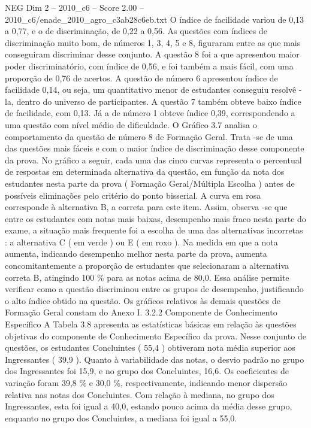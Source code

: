 \begin{textsample}{NEG Dim 2 – 2010\_c6 – Score 2.00 – 2010\_c6/enade\_2010\_agro\_c3ab28c6eb.txt}
O índice de facilidade variou de 0,13 a 0,77, e o de discriminação, de 0,22 a 0,56.
As questões com índices de discriminação muito bom, de números 1, 3, 4, 5 e 8, figuraram entre as que mais conseguiram discriminar desse conjunto.
A questão 8 foi a que apresentou maior poder discriminatório, com índice de 0,56, e foi também a mais fácil, com uma proporção de 0,76 de acertos.
A questão de número 6 apresentou índice de facilidade 0,14, ou seja, um quantitativo menor de estudantes conseguiu resolvê -la, dentro do universo de participantes.
A questão 7 também obteve baixo índice de facilidade, com 0,13.
Já a de número 1 obteve índice 0,39, correspondendo a uma questão com nível médio de dificuldade.
O Gráfico 3.7 analisa o comportamento da questão de número 8 de Formação Geral.
Trata -se de uma das questões mais fáceis e com o maior índice de discriminação desse componente da prova.
No gráfico a seguir, cada uma das cinco curvas representa o percentual de respostas em determinada alternativa da questão, em função da nota dos estudantes nesta parte da prova ( Formação Geral/Múltipla Escolha ) antes de possíveis eliminações pelo critério do ponto bisserial.
A curva em rosa corresponde à alternativa B, a correta para este item.
Assim, observa -se que entre os estudantes com notas mais baixas, desempenho mais fraco nesta parte do exame, a situação mais frequente foi a escolha de uma das alternativas incorretas : a alternativa C ( em verde ) ou E ( em roxo ).
Na medida em que a nota aumenta, indicando desempenho melhor nesta parte da prova, aumenta concomitantemente a proporção de estudantes que selecionaram a alternativa correta B, atingindo 100 \% para as notas acima de 80,0.
Essa análise permite verificar como a questão discriminou entre os grupos de desempenho, justificando o alto índice obtido na questão.
Os gráficos relativos às demais questões de Formação Geral constam do Anexo I. 3.2.2 Componente de Conhecimento Específico A Tabela 3.8 apresenta as estatísticas básicas em relação às questões objetivas do componente de Conhecimento Específico da prova.
Nesse conjunto de questões, os estudantes Concluintes ( 55,4 ) obtiveram nota média superior aos Ingressantes ( 39,9 ).
Quanto à variabilidade das notas, o desvio padrão no grupo dos Ingressantes foi 15,9, e no grupo dos Concluintes, 16,6.
Os coeficientes de variação foram 39,8 \% e 30,0 \%, respectivamente, indicando menor dispersão relativa nas notas dos Concluintes.
Com relação à mediana, no grupo dos Ingressantes, esta foi igual a 40,0, estando pouco acima da média desse grupo, enquanto no grupo dos Concluintes, a mediana foi igual a 55,0.

\end{textsample}
